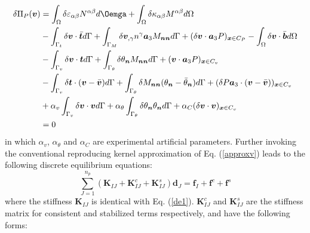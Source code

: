 \begin{equation}
\begin{split}
\delta \Pi_P(\boldsymbol v) &= \int_\Omega\delta \varepsilon_{\alpha\beta} N^{\alpha\beta} d\Oemga +
\int_\Omega \delta \kappa_{\alpha\beta}M^{\alpha\beta} d\Omega \\
                     &- \int_{\Gamma_t} \delta \boldsymbol v \cdot \bar{\boldsymbol t} d\Gamma 
                     + \int_{\Gamma_M} \delta \boldsymbol v_{,\gamma} n^\gamma \boldsymbol a_3 M_{\boldsymbol{nn}} d\Gamma
                     + (\delta \boldsymbol v \cdot \boldsymbol a_3 P)_{\boldsymbol x \in C_P}
                     - \int_\Omega \delta \boldsymbol v \cdot \bar{\boldsymbol b} d\Omega \\
                     &- \int_{\Gamma_v} \delta \boldsymbol v \cdot \boldsymbol t d\Gamma 
                     + \int_{\Gamma_\theta} \delta \theta_{\boldsymbol n} M_{\boldsymbol{nn}}d\Gamma 
                     + (\boldsymbol v \cdot \boldsymbol a_3 P)_{\boldsymbol x \in C_v}\\
                     &- \int_{\Gamma_v} \delta \boldsymbol t \cdot (\boldsymbol v - \bar{\boldsymbol v}) d\Gamma
                     + \int_{\Gamma_\theta} \delta M_{\boldsymbol{nn}}(\theta_{\boldsymbol n} - \bar \theta_{\boldsymbol n})d\Gamma
                     + (\delta P\boldsymbol a_3 \cdot (\boldsymbol v - \bar{\boldsymbol v}))_{\boldsymbol x \in C_v} \\
                     &+ \alpha_v \int_{\Gamma_v} \delta \boldsymbol v \cdot \boldsymbol v d\Gamma 
                     + \alpha_\theta \int_{\Gamma_\theta} \delta \theta_{\boldsymbol n}\theta_{\boldsymbol n} d\Gamma
                     + \alpha_C(\delta \boldsymbol v \cdot \boldsymbol v)_{\boldsymbol x\in C_v} \\
                     &= 0
\end{split}
\end{equation}
in which $\alpha_v$, $\alpha_\theta$ and $\alpha_C$ are experimental artificial parameters. Further invoking the conventional reproducing kernel approximation of Eq. (\ref{approxv}) leads to the following discrete equilibrium equations:
\begin{equation}
\sum_{J=1}^{n_p}(\boldsymbol K_{IJ} + \boldsymbol K^c_{IJ} + \boldsymbol K^s_{IJ}) \boldsymbol d_J = \boldsymbol f_I + \boldsymbol f^c + \boldsymbol f^s
\end{equation}
where the stiffness $\boldsymbol K_{IJ}$ is identical with Eq. (\ref{de1}). $\boldsymbol K^c_{IJ}$ and $\boldsymbol K^s_{IJ}$ are the stiffness matrix for consistent and stabilized terms respectively, and have the following forms:
